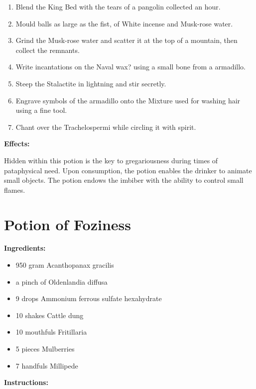 \documentclass{article}
\begin{document}
\begin{enumerate}
  \item Blend the King Bed with the tears of a pangolin collected an hour.
  \item Mould balls as large as the fist, of White incense and Musk-rose water.
  \item Grind the Musk-rose water and scatter it at the top of a mountain, then collect the remnants.
  \item Write incantations on the Naval wax? using a small bone from a armadillo.
  \item Steep the Stalactite in lightning and stir secretly.
  \item Engrave symbols of the armadillo onto the Mixture used for washing hair using a fine tool.
  \item Chant over the Trachelospermi while circling it with spirit.
\end{enumerate}

\textbf{Effects:}

Hidden within this potion is the key to gregariousness during times of pataphysical need. Upon consumption, the potion enables the drinker to animate small objects. The potion endows the imbiber with the ability to control small flames.

\newpage
\section*{Potion of Foziness}

\textbf{Ingredients:}

\begin{itemize}
  \item 950 gram Acanthopanax gracilis
  \item a pinch of Oldenlandia diffusa
  \item 9 drops Ammonium ferrous sulfate hexahydrate
  \item 10 shakes Cattle dung
  \item 10 mouthfuls Fritillaria
  \item 5 pieces Mulberries
  \item 7 handfuls Millipede
\end{itemize}

\textbf{Instructions:}
\end{document}
